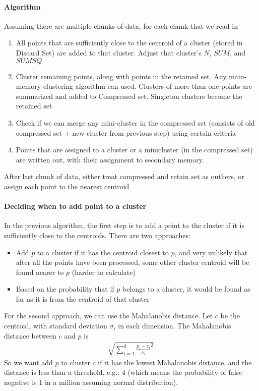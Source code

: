 \paragraph{Algorithm} 
Assuming there are multiple chunks of data, for each chunk that we read in
    \begin{enumerate}
        \item All points that are sufficiently close to the centroid of a cluster (stored in Discard Set) are added to that cluster. Adjust that cluster's $N$, $SUM$, and $SUMSQ$
        \item Cluster remaining points, along with points in the retained set. Any main-memory clustering algorithm can used. Clusters of more than one points are summarized and added to Compressed set. Singleton clusters become the retained set 
        \item Check if we can merge any mini-cluster in the compressed set (consists of old compressed set + new cluster from previous step) using certain criteria
        \item Points that are assigned to a cluster or a minicluster (in the compressed set) are written out, with their assignment to secondary memory. 
    \end{enumerate}
After last chunk of data, either treat compressed and retain set as outliers, or assign each point to the nearest centroid 

\paragraph{Deciding when to add point to a cluster}
In the previous algorithm, the first step is to add a point to the cluster if it is sufficiently close to the centroids. There are two approaches: 
    \begin{itemize}
        \item Add $p$ to a cluster if it has the centroid closest to $p$, and very unlikely that after all the points have been processed, some other cluster centroid will be found nearer to $p$  (harder to calculate)
        \item Based on the probability that if $p$ belongs to a cluster, it would be found as far as it is from the centroid of that cluster
    \end{itemize}
For the second approach, we can use the Mahalanobis distance. Let $c$ be the centroid, with standard deviation $\sigma_i$ in each dimension. The Mahalanobis distance between $c$ and $p$ is 
    \begin{align*}
        \sqrt{\sum_{i=1}^d \frac{p_i - c_i}{\sigma_i}^2}
    \end{align*}
So we want add $p$ to cluster $c$ if it has the lowest Mahalanobis distance, and the distance is less than a threshold, e.g.: 4 (which means the probability of false negative is 1 in a million assuming normal distribution). 

